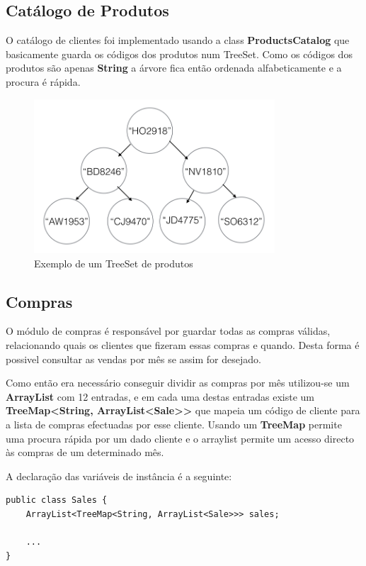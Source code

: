 \documentclass[10pt] {article}
\begin{document}
\newpage
\subsection{Catálogo de Produtos}

O catálogo de clientes foi implementado usando a class  \textbf{ProductsCatalog} que basicamente guarda os códigos dos produtos num TreeSet.
Como os códigos dos produtos são apenas \textbf{String} a árvore fica então ordenada alfabeticamente e a procura é rápida.

\begin{figure}[ht!]
\centering
\includegraphics[width=90mm]{catprodutos.png}
\caption{Exemplo de um TreeSet de produtos}
\label{fig:catprodutos}
\end{figure}

\subsection{Compras}

O módulo de compras é responsável por guardar todas as compras válidas, relacionando quais os clientes que fizeram essas compras e quando.
Desta forma é possivel consultar as vendas por mês se assim for desejado.

Como então era necessário conseguir dividir as compras por mês utilizou-se um \textbf{ArrayList} com 12 entradas, e em cada uma destas entradas existe um \textbf{TreeMap\textless String, ArrayList\textless Sale\textgreater\textgreater} que mapeia um código de cliente para a lista de compras efectuadas por esse cliente.
Usando um \textbf{TreeMap} permite uma procura rápida por um dado cliente e o arraylist permite um acesso directo às compras de um determinado mês.

A declaração das variáveis de instância é a seguinte:

\begin{lstlisting}
public class Sales {
	ArrayList<TreeMap<String, ArrayList<Sale>>> sales;

	...
}
\end{lstlisting}
\end{document}
